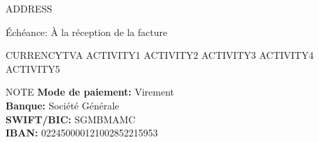 \documentclass{letter}
\date{Date de facturation: DATE \\
      Facture Numéro: 2020 - 
      COUNTER
      }
\begin{document}
  \begin{letter}{ 
  ADDRESS
  }         
    \opening{Échéance: À la réception de la facture}
    \begin{invoice}{CURRENCY}{TVA}
	ACTIVITY1
	ACTIVITY2
	ACTIVITY3
	ACTIVITY4
	ACTIVITY5
    \end{invoice}
    NOTE
    \vspace{.5cm}
    \textbf{Mode de paiement:} Virement\\
    \textbf{Banque:} Société Générale\\
    \textbf{SWIFT/BIC:} SGMBMAMC\\
    \textbf{IBAN:} 022450000121002852215953\\
  \end{letter}
\end{document}
